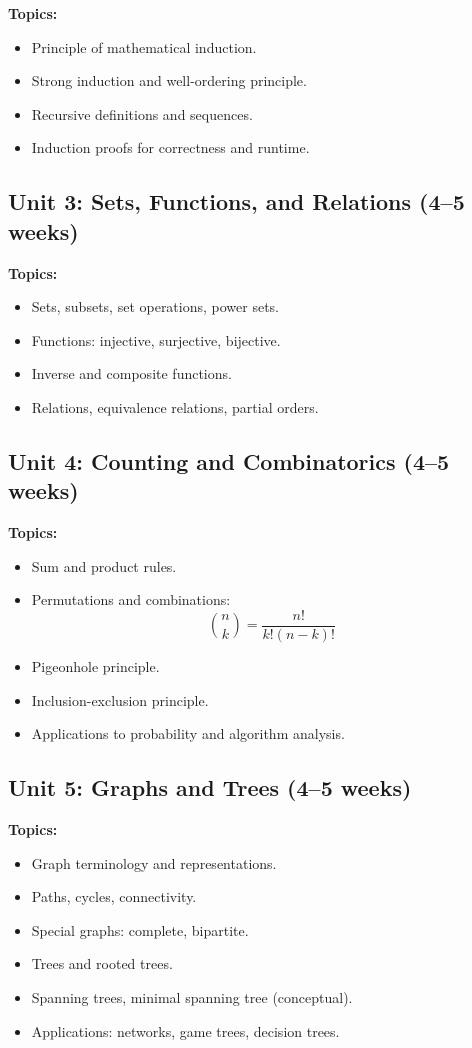 \documentclass[12pt,oneside]{book}
\begin{document}
\textbf{Topics:}
\begin{itemize}
    \item Principle of mathematical induction.
    \item Strong induction and well-ordering principle.
    \item Recursive definitions and sequences.
    \item Induction proofs for correctness and runtime.
\end{itemize}

\subsection{Unit 3: Sets, Functions, and Relations (4--5 weeks)}

\textbf{Topics:}
\begin{itemize}
    \item Sets, subsets, set operations, power sets.
    \item Functions: injective, surjective, bijective.
    \item Inverse and composite functions.
    \item Relations, equivalence relations, partial orders.
\end{itemize}

\subsection{Unit 4: Counting and Combinatorics (4--5 weeks)}

\textbf{Topics:}
\begin{itemize}
    \item Sum and product rules.
    \item Permutations and combinations:
    \[
        \binom{n}{k} = \frac{n!}{k!(n-k)!}
    \]
    \item Pigeonhole principle.
    \item Inclusion-exclusion principle.
    \item Applications to probability and algorithm analysis.
\end{itemize}

\subsection{Unit 5: Graphs and Trees (4--5 weeks)}

\textbf{Topics:}
\begin{itemize}
    \item Graph terminology and representations.
    \item Paths, cycles, connectivity.
    \item Special graphs: complete, bipartite.
    \item Trees and rooted trees.
    \item Spanning trees, minimal spanning tree (conceptual).
    \item Applications: networks, game trees, decision trees.
\end{itemize}
\end{document}
